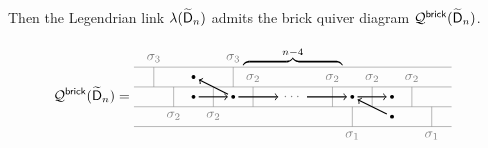 Then the Legendrian link $\lambda({\widetilde{\mathsf{D}}}_n)$ admits the brick quiver diagram $\mathcal{Q}^{\mathsf{brick}}({\widetilde{\mathsf{D}}}_n)$.

\begin{align*}
\quiver^{\mathsf{brick}}({\exdynD}_n)&=
\begin{tikzpicture}[baseline=-5.5ex]
\draw[gray] (0,0) to (8,0) (0,-0.5) to (8,-0.5) (0,-1) to (8,-1) (0,-1.5) to (8,-1.5);
\draw[gray] (0.5,0) node[above] {$\sigma_3$} to (0.5,-0.5) (2.5,0) node[above] {$\sigma_3$} to (2.5,-0.5) 
(1,-0.5) to (1,-1) node[below] {$\sigma_2$} (2,-0.5) to (2,-1)node[below] {$\sigma_2$} (3,-0.5) node[above] {$\sigma_2$} to (3,-1) (5,-0.5) node[above] {$\sigma_2$} to (5,-1) (6,-0.5)  node[above] {$\sigma_2$} to (6,-1) (7,-0.5)  node[above] {$\sigma_2$} to (7,-1)
(5.5,-1) to (5.5,-1.5)node[below] {$\sigma_1$} (7.5,-1) to (7.5,-1.5) node[below] {$\sigma_1$} (4,-0.75) node (dots) {$\cdots$};
\draw[thick,fill] 
(1.5,-0.25) circle (1pt) node (D1) {}
(1.5,-0.75) circle (1pt) node (D2) {}
(2.5,-0.75) circle (1pt) node (D3) {}
(5.5,-0.75) circle (1pt) node (D4) {}
(6.5,-0.75) circle (1pt) node (D5) {}
(6.5,-1.25) circle (1pt) node (D6) {}
;
\draw (4,-0.5) node[yshift=5ex] {$\overbrace{\hphantom{\hspace{2.5cm}}}^{n-4}$};
\draw[thick,->] (D2) to (D3);
\draw[thick,->] (D3) to (dots);
\draw[thick,->] (dots) to (D4);
\draw[thick,->] (D4) to (D5);
\draw[thick,->] (D3) to (D1);
\draw[thick,->] (D6) to (D4);
\end{tikzpicture}
\end{align*}

